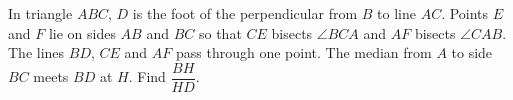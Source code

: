 In triangle $ABC$, $D$ is the foot of the perpendicular from $B$ to line $AC$. Points $E$ and $F$ lie on sides $AB$ and $BC$ so that $CE$ bisects $\angle BCA$ and $AF$ bisects $\angle CAB$. The lines $BD$, $CE$ and $AF$ pass through one point. The median from $A$ to side $BC$ meets $BD$ at $H$. Find $\dfrac{BH}{HD}$.
